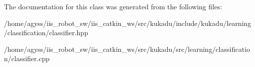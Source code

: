 The documentation for this class was generated from the following files\+:\begin{DoxyCompactItemize}
\item 
/home/agyss/iis\+\_\+robot\+\_\+sw/iis\+\_\+catkin\+\_\+ws/src/kukadu/include/kukadu/learning/classification/classifier.\+hpp\item 
/home/agyss/iis\+\_\+robot\+\_\+sw/iis\+\_\+catkin\+\_\+ws/src/kukadu/src/learning/classification/classifier.\+cpp\end{DoxyCompactItemize}

